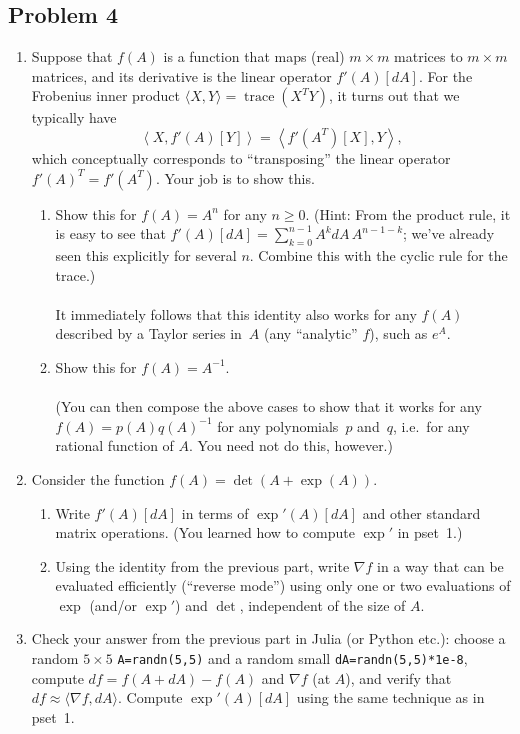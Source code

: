 \documentclass[10pt,oneside]{article}
\newcommand{\tr}{\operatorname{trace}}
\begin{document}
\subsection*{Problem 4}
\begin{enumerate}
\item Suppose that $f(A)$ is a function that maps (real) $m\times m$ matrices
to $m\times m$ matrices, and its derivative is the linear operator
$f'(A)[dA]$. For the Frobenius inner product $\langle X,Y\rangle=\tr(X^{T}Y)$,
it turns out that we typically have
\[
\left\langle X,f'(A)[Y]\right\rangle =\left\langle f'(A^{T})[X],Y\right\rangle ,
\]
which conceptually corresponds to “transposing” the linear operator
$f'(A)^{T}=f'(A^{T})$. Your job is to show this.
\begin{enumerate}
\item Show this for $f(A)=A^{n}$ for any $n\ge0$. (Hint: From the product
rule, it is easy to see that $f'(A)[dA]=\sum_{k=0}^{n-1}A^{k}dA\,A^{n-1-k}$;
we've already seen this explicitly for several $n$. Combine this
with the cyclic rule for the trace.)\\
\\
It immediately follows that this identity also works for any $f(A)$
described by a Taylor series in~$A$ (any ``analytic'' $f$), such
as $e^{A}$.
\item Show this for $f(A)=A^{-1}$.\\
\\
(You can then compose the above cases to show that it works for any
$f(A)=p(A)q(A)^{-1}$ for any polynomials~$p$ and~$q$, i.e.~for
any rational function of $A$. You need not do this, however.)
\end{enumerate}
\item Consider the function $f(A)=\det(A + \exp(A))$.
\begin{enumerate}
\item Write $f'(A)[dA]$ in terms of $\exp'(A)[dA]$ and other standard matrix operations. (You learned how to
compute $\exp'$ in pset~1.)
\item Using the identity from the previous part, write $\nabla f$ in a
way that can be evaluated efficiently (“reverse mode”) using
only one or two evaluations of $\exp$ (and/or $\exp'$) and $\det$,
independent of the size of $A$.
\end{enumerate}
\item Check your answer from the previous part in Julia (or Python etc.):
choose a random $5\times5$ \texttt{A=randn(5,5)} and a random small
\texttt{dA=randn(5,5){*}1e-8}, compute $df=f(A+dA)-f(A)$ and $\nabla f$
(at $A$), and verify that $df\approx\langle\nabla f,dA\rangle$.
Compute $\exp'(A)[dA]$ using the same technique as in pset~1.
\end{enumerate}
\end{document}
